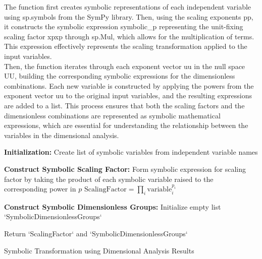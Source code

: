 \documentclass{article}
\begin{document}
The function first creates symbolic representations of each independent variable using sp.symbols from the SymPy library. Then, using the scaling exponents pp, it constructs the symbolic expression symbolic\_p representing the unit-fixing scaling factor xpxp through sp.Mul, which allows for the multiplication of terms. This expression effectively represents the scaling transformation applied to the input variables.\\

Then, the function iterates through each exponent vector uu in the null space UU, building the corresponding symbolic expressions for the dimensionless combinations. Each new variable is constructed by applying the powers from the exponent vector uu to the original input variables, and the resulting expressions are added to a list. This process ensures that both the scaling factors and the dimensionless combinations are represented as symbolic mathematical expressions, which are essential for understanding the relationship between the variables in the dimensional analysis.\\



\begin{algorithm}[H]
\SetAlgoLined
{}

\textbf{Initialization:}\;
Create list of symbolic variables from independent variable names\;

\textbf{Construct Symbolic Scaling Factor:}\;
Form symbolic expression for scaling factor by taking the product of each symbolic variable raised to the corresponding power in \(p\)\;
\( \text{ScalingFactor} = \prod_{i} \text{variable}_i^{p_i} \)\;

\textbf{Construct Symbolic Dimensionless Groups:}\;
Initialize empty list `SymbolicDimensionlessGroups`\;

Return `ScalingFactor` and `SymbolicDimensionlessGroups`\;

\caption{Symbolic Transformation using Dimensional Analysis Results}
\label{alg:symbolic_transformation} %
\end{algorithm}\\
\end{document}
